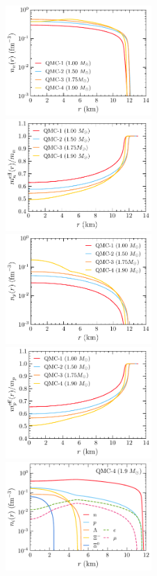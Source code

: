 \begin{figure}
    \centering
    \includegraphics[width=0.495\textwidth]{nn_QMC_profs.pdf}
    \includegraphics[width=0.495\textwidth]{meff_n_QMC_profs.pdf}
    \includegraphics[width=0.495\textwidth]{np_QMC_profs.pdf}
    \includegraphics[width=0.495\textwidth]{meff_p_QMC_profs.pdf}
    \includegraphics[width=0.495\textwidth]{ni_QMC_profs.pdf}

\end{figure}
